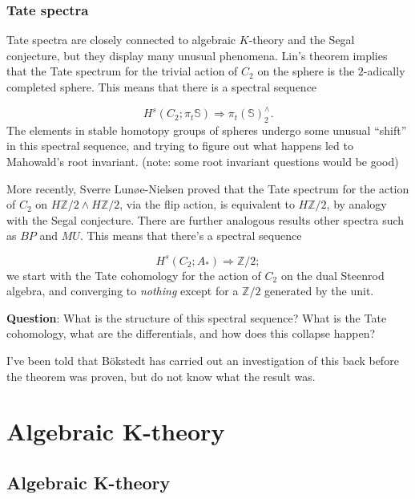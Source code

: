 \documentclass[12pt,titlepage]{article}
\theoremstyle{plain}
\theoremstyle{definition}
\theoremstyle{remark}
\begin{document}
\hypertarget{tate_spectra_4}{}\subsubsection{{Tate spectra}}\label{tate_spectra_4}

Tate spectra are closely connected to algebraic $K$-theory and the Segal conjecture, but they display many unusual phenomena. Lin'{}s theorem implies that the Tate spectrum for the trivial action of $C_2$ on the sphere is the $2$-adically completed sphere. This means that there is a spectral sequence

\begin{displaymath}
H^s(C_2; \pi_t \mathbb{S}) \Rightarrow \pi_t(\mathbb{S})^\wedge_2.
\end{displaymath}
The elements in stable homotopy groups of spheres undergo some unusual ``{}shift''{} in this spectral sequence, and trying to figure out what happens led to Mahowald'{}s root invariant. (note: some root invariant questions would be good)

More recently, Sverre Lunøe-Nielsen proved that the Tate spectrum for the action of $C_2$ on $H\mathbb{Z}/2 \wedge H\mathbb{Z}/2$, via the flip action, is equivalent to $H\mathbb{Z}/2$, by analogy with the Segal conjecture. There are further analogous results other spectra such as $BP$ and $MU$. This means that there'{}s a spectral sequence

\begin{displaymath}
H^s(C_2; A_*) \Rightarrow \mathbb{Z}/2;
\end{displaymath}
we start with the Tate cohomology for the action of $C_2$ on the dual Steenrod algebra, and converging to \emph{nothing} except for a $\mathbb{Z}/2$ generated by the unit.

\textbf{Question}: What is the structure of this spectral sequence? What is the Tate cohomology, what are the differentials, and how does this collapse happen?

I'{}ve been told that Bökstedt has carried out an investigation of this back before the theorem was proven, but do not know what the result was.

\section{Algebraic K-theory}

\hypertarget{algebraic_ktheory_1}{}\subsection{{Algebraic K-theory}}\label{algebraic_ktheory_1}
\end{document}
